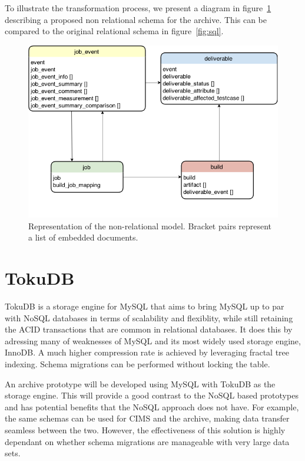 To illustrate the transformation process, we present a diagram in figure~\ref{fig:nosql} describing a proposed non relational schema for the archive. This can be compared to the original relational schema in figure~\ref{fig:sql}.

\begin{figure}[h!]
\centering
\includegraphics[scale=0.5]{figure/nosql.png}
\caption{Representation of the non-relational model. Bracket pairs represent a list of embedded documents.}
\label{fig:nosql}
\end{figure}

\section{TokuDB}
TokuDB is a storage engine for MySQL that aims to bring MySQL up to par with NoSQL databases in terms of scalability and flexiblity, while still retaining the ACID transactions that are common in relational databases. It does this by adressing many of weaknesses of MySQL and its most widely used storage engine, InnoDB. A much higher compression rate is achieved by leveraging fractal tree indexing. Schema migrations can be performed without locking the table.

An archive prototype will be developed using MySQL with TokuDB as the storage engine. This will provide a good contrast to the NoSQL based prototypes and has potential benefits that the NoSQL approach does not have. For example, the same schemas can be used for CIMS and the archive, making data transfer seamless between the two. However, the effectiveness of this solution is highly dependant on whether schema migrations are manageable with very large data sets.

